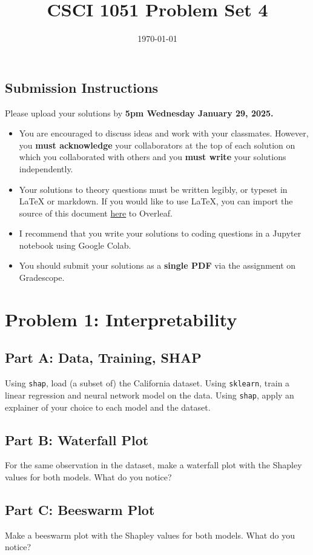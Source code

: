 \documentclass{article}
\title{CSCI 1051 Problem Set 4}
\author{} %
\date{\today}
\begin{document}
\maketitle

\subsection*{Submission Instructions}

Please upload your solutions by
\textbf{5pm Wednesday January 29, 2025.}
\begin{itemize}
\item You are encouraged to discuss ideas
and work with your classmates. However, you
\textbf{must acknowledge} your collaborators
at the top of each solution on which
you collaborated with others 
and you \textbf{must write} your solutions
independently.
\item Your solutions to theory questions must
be written legibly, or typeset in LaTeX or markdown.
If you would like to use LaTeX, you can import the source of this document 
\href{https://www.rtealwitter.com/deeplearning/psets/pset2.tex}{here}
to Overleaf.
\item I recommend that you write your solutions to coding questions in a Jupyter notebook using Google Colab.
\item You should submit your solutions as a \textbf{single PDF} via the assignment on Gradescope.
\end{itemize}

\newpage
\section*{Problem 1: Interpretability}

\subsection*{Part A: Data, Training, SHAP}

Using \texttt{shap}, load (a subset of) the California dataset.
Using \texttt{sklearn}, train a linear regression and neural network model on the data.
Using \texttt{shap}, apply an explainer of your choice to each model and the dataset.

\subsection*{Part B: Waterfall Plot}

For the same observation in the dataset, make a waterfall plot with the Shapley values for both models. What do you notice?

\subsection*{Part C: Beeswarm Plot}
Make a beeswarm plot with the Shapley values for both models. What do you notice?
\end{document}
